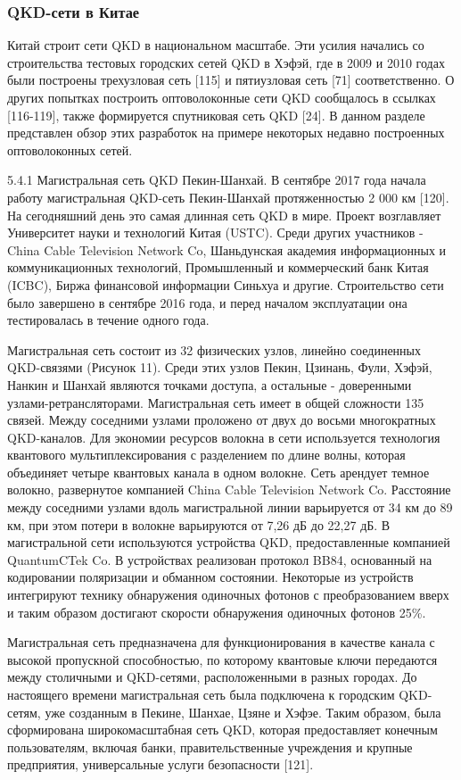\subsubsection*{QKD-сети в Китае}
Китай строит сети QKD в национальном масштабе. Эти усилия начались со строительства тестовых городских сетей QKD в Хэфэй, где в 2009 и 2010 годах были построены трехузловая сеть [115] и пятиузловая сеть [71] соответственно. О других попытках построить оптоволоконные сети QKD сообщалось в ссылках [116-119], также формируется спутниковая сеть QKD [24]. В данном разделе представлен обзор этих разработок на примере некоторых недавно построенных оптоволоконных сетей.

5.4.1 Магистральная сеть QKD Пекин-Шанхай. В сентябре 2017 года начала работу магистральная QKD-сеть Пекин-Шанхай протяженностью 2 000 км [120]. На сегодняшний день это самая длинная сеть QKD в мире. Проект возглавляет Университет науки и технологий Китая (USTC). Среди других участников - China Cable Television Network Co, Шаньдунская академия информационных и коммуникационных технологий, Промышленный и коммерческий банк Китая (ICBC), Биржа финансовой информации Синьхуа и другие. Строительство сети было завершено в сентябре 2016 года, и перед началом эксплуатации она тестировалась в течение одного года.

Магистральная сеть состоит из 32 физических узлов, линейно соединенных QKD-связями (Рисунок 11). Среди этих узлов Пекин, Цзинань, Фули, Хэфэй, Нанкин и Шанхай являются точками доступа, а остальные - доверенными узлами-ретрансляторами. Магистральная сеть имеет в общей сложности 135 связей.
Между соседними узлами проложено от двух до восьми многократных QKD-каналов. Для экономии ресурсов волокна в сети используется технология квантового мультиплексирования с разделением по длине волны, которая объединяет четыре квантовых канала в одном волокне. Сеть арендует темное волокно, развернутое компанией China Cable Television Network Co. Расстояние между соседними узлами вдоль магистральной линии варьируется от 34 км до
89 км, при этом потери в волокне варьируются от 7,26 дБ до 22,27 дБ.
В магистральной сети используются устройства QKD, предоставленные компанией QuantumCTek Co. В устройствах реализован протокол BB84, основанный на кодировании поляризации и обманном состоянии. Некоторые из устройств интегрируют технику обнаружения одиночных фотонов с преобразованием вверх и таким образом достигают скорости обнаружения одиночных фотонов 25\%.

Магистральная сеть предназначена для функционирования в качестве канала с высокой пропускной способностью, по которому квантовые ключи передаются между столичными и QKD-сетями, расположенными в разных городах. До настоящего времени магистральная сеть была подключена к городским QKD-сетям, уже созданным в Пекине, Шанхае, Цзяне и Хэфэе. Таким образом, была сформирована широкомасштабная сеть QKD, которая предоставляет конечным пользователям, включая банки, правительственные учреждения и крупные предприятия, универсальные услуги безопасности [121].

